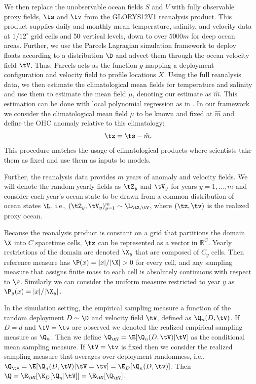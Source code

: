 We then replace the unobservable ocean fields $S$ and $V$ with fully observable proxy fields, $\ts$ and $\tv$ from the GLORYS12V1 reanalysis product.\cite{glorys}
This product supplies daily and monthly mean temperature, salinity, and velocity data at $1/12^{\circ}$ grid cells and 50 vertical levels, down to over $5000m$ for deep ocean areas. 
Further, we use the Parcels Lagragian simulation framework to deploy floats according to a distribution $\D$ and advect them through the ocean velocity field $\tV$.
Thus, Parcels acts as the function $g$ mapping a deployment configuration and velocity field to profile locations $X$.
Using the full reanalysis data, we then estimate the climatological mean fields for temperature and salinity and use them to estimate the mean field $\mu$, denoting our estimate as $\hat{m}$.
This estimation can be done with local polynomial regression as in \cite{rg}.
In our framework we consider the climatological mean field $\mu$ to be known and fixed at $\hat{m}$ and define the OHC anomaly relative to this climatology:
\begin{equation}
  \tz = \ts - \hat{m}.
\end{equation}
This procedure matches the usage of climatological products where scientists take them as fixed and use them as inputs to models.

Further, the reanalysis data provides $m$ years of anomaly and velocity fields. We will denote the random yearly fields as $\tZ_y$ and $\tV_y$ for years $y = 1,\ldots,m$ and consider each year's ocean state to be drawn from a common distribution of ocean states $\L$, i.e., $(\tZ_y, \tV_y)_{y=1}^{m} \sim \L_{\tZ,\tV}$, where $(\tz, \tv)$ is the realized proxy ocean.

Because the reanalysis product is constant on a grid that partitions the domain $\X$ into $C$ spacetime cells, $\tz$ can be represented as a vector in $\mathbb{R}^C$. Yearly restrictions of the domain are denoted $\X_y$ that are composed of $C_y$ cells. Then reference measure has $\P(x) = |x|/|\X| > 0$ for every cell, and any sampling measure that assigns finite mass to each cell is absolutely continuous with
respect to $\P$. Similarly we can consider the uniform measure restricted to year $y$ as $\P_y(x) = |x|/|\X_y|$.

In the simulation setting, the empirical sampling measure a function of the random deployment $D \sim \D$ and velocity field $\tV$, defined as $\Q_n(D,\tV)$.
If $D = d$ and $\tV = \tv$ are observed we denoted the realized empirical sampling measure as $\Q_n$.
Then we define $\Q_{\tV} = \E[\Q_n(D,\tV)|\tV]$ as the conditional mean sampling measure. If $\tV = \tv$ is fixed then we consider the realized sampling measure that averages over deployment randomness, i.e., $\Q_{\tv} = \E[\Q_n(D,\tV)|\tV = \tv] = \E_D[\Q_n(D,\tv)]$. 
Then $\Q = \E_{\tV}[\E_D[\Q_n | \tV]] = \E_{\tV}[\Q_{\tV}]$. 

